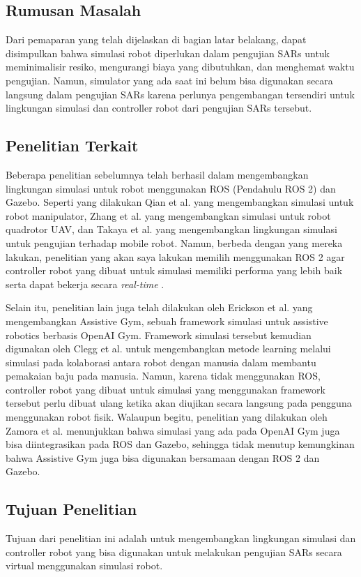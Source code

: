 \subsection{Rumusan Masalah}

Dari pemaparan yang telah dijelaskan di bagian latar belakang, dapat disimpulkan bahwa simulasi robot diperlukan dalam pengujian SARs untuk meminimalisir resiko, mengurangi biaya yang dibutuhkan, dan menghemat waktu pengujian.
Namun, simulator yang ada saat ini belum bisa digunakan secara langsung dalam pengujian SARs karena perlunya pengembangan tersendiri untuk lingkungan simulasi dan controller robot dari pengujian SARs tersebut.

\subsection{Penelitian Terkait}

Beberapa penelitian sebelumnya telah berhasil dalam mengembangkan lingkungan simulasi untuk robot menggunakan ROS (Pendahulu ROS 2) dan Gazebo.
Seperti yang dilakukan Qian et al. \citep{Qian2014} yang mengembangkan simulasi untuk robot manipulator, Zhang et al. \citep{Zhang2015} yang mengembangkan simulasi untuk robot quadrotor UAV, dan Takaya et al. \citep{Takaya2016} yang mengembangkan lingkungan simulasi untuk pengujian terhadap mobile robot.
Namun, berbeda dengan yang mereka lakukan, penelitian yang akan saya lakukan memilih menggunakan ROS 2 agar controller robot yang dibuat untuk simulasi memiliki performa yang lebih baik serta dapat bekerja secara \emph{real-time} \citep{Maruyama2016}.

Selain itu, penelitian lain juga telah dilakukan oleh Erickson et al. \citep{Erickson2020} yang mengembangkan Assistive Gym, sebuah framework simulasi untuk assistive robotics berbasis OpenAI Gym.
Framework simulasi tersebut kemudian digunakan oleh Clegg et al. \citep{Clegg2020} untuk mengembangkan metode learning melalui simulasi pada kolaborasi antara robot dengan manusia dalam membantu pemakaian baju pada manusia.
Namun, karena tidak menggunakan ROS, controller robot yang dibuat untuk simulasi yang menggunakan framework tersebut perlu dibuat ulang ketika akan diujikan secara langsung pada pengguna menggunakan robot fisik.
Walaupun begitu, penelitian yang dilakukan oleh Zamora et al. \citep{Zamora2016} menunjukkan bahwa simulasi yang ada pada OpenAI Gym juga bisa diintegrasikan pada ROS dan Gazebo, sehingga tidak menutup kemungkinan bahwa Assistive Gym juga bisa digunakan bersamaan dengan ROS 2 dan Gazebo.

\subsection{Tujuan Penelitian}

Tujuan dari penelitian ini adalah untuk mengembangkan lingkungan simulasi dan controller robot yang bisa digunakan untuk melakukan pengujian SARs secara virtual menggunakan simulasi robot.
